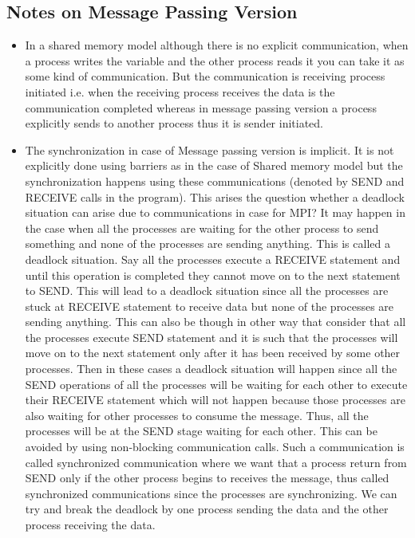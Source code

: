 \documentclass[12pt]{book}
\begin{document}
\subsection{Notes on Message Passing Version}
\begin{itemize}
    \item In a shared memory model although there is no explicit communication,
    when a process writes the variable and the other process reads it you can take it as some kind of communication. But the communication 
    is receiving process initiated i.e. when the receiving process receives the data is the communication completed whereas in message passing version
    a process explicitly sends to another process thus it is sender initiated. 
    \item The synchronization in case of Message passing version is implicit. It is not explicitly done using barriers as in the case of Shared memory model
    but the synchronization happens using these communications (denoted by SEND and RECEIVE calls in the program).
    This arises the question whether a deadlock situation can arise due to communications in case for MPI? It may happen in the case when all the processes are waiting for the other process to send something 
    and none of the processes are sending anything. This is called a deadlock situation. Say all the processes execute a RECEIVE statement and until this operation is completed they cannot move on to the next statement to SEND.
    This will lead to a deadlock situation since all the processes are stuck at RECEIVE statement to receive data but none of the processes are sending anything. This can also be though in other way that consider that all the processes execute SEND statement
    and it is such that the processes will move on to the next statement only after it has been received by some other processes. Then in these cases a deadlock situation will happen since all the SEND operations of all the processes will be waiting for each other 
    to execute their RECEIVE statement which will not happen because those processes are also waiting for other processes to consume the message. Thus, all the processes will be at the SEND stage waiting for each other.
    This can be avoided by using non-blocking communication calls. Such a communication is called synchronized communication where we want that a process return from SEND only if the other process begins to receives the message, thus called synchronized communications since the 
    processes are synchronizing. We can try and break the deadlock by one process sending the data and the other process receiving the data.

\end{itemize}
\end{document}
